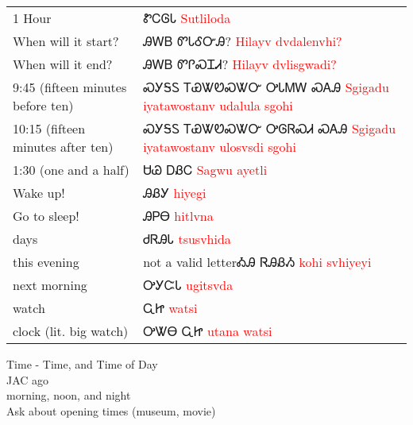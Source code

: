 \vfill\newpage\begin{minipage}{\linewidth}\begin{tabular}{p{3cm} p{11cm}}
1 Hour & ᏑᏟᎶᏓ 
 \newline \textcolor{red}{Sutliloda}\\
When will it start? & ᎯᎳᏴ ᏛᏓᎴᏅᎯ? 
 \newline \textcolor{red}{Hilayv dvdalenvhi?}\\
When will it end? & ᎯᎳᏴ ᏛᎵᏍᏆᏗ? 
 \newline \textcolor{red}{Hilayv dvlisgwadi?}\\
9:45 (fifteen minutes before ten) & ᏍᎩᎦᏚ ᎢᏯᏔᏬᏍᏔᏅ ᎤᏓᎷᎳ ᏍᎪᎯ 
 \newline \textcolor{red}{Sgigadu iyatawostanv udalula sgohi}\\
10:15 (fifteen minutes after ten) & ᏍᎩᎦᏚ ᎢᏯᏔᏬᏍᏔᏅ ᎤᎶᏒᏍᏗ ᏍᎪᎯ 
 \newline \textcolor{red}{Sgigadu iyatawostanv ulosvsdi sgohi}\\
1:30 (one and a half) & ᏌᏊ ᎠᏰᏟ 
 \newline \textcolor{red}{Sagwu ayetli}\\
Wake up! & ᎯᏰᎩ 
 \newline \textcolor{red}{hiyegi}\\
Go to sleep! & ᎯᏢᎾ 
 \newline \textcolor{red}{hitlvna}\\
days & ᏧᏒᎯᏓ 
 \newline \textcolor{red}{tsusvhida}\\
this evening & not a valid letterᎣᎯ ᏒᎯᏰᏱ 
 \newline \textcolor{red}{kohi svhiyeyi}\\
next morning & ᎤᎩᏨᏓ 
 \newline \textcolor{red}{ugitsvda}\\
watch & ᏩᏥ 
 \newline \textcolor{red}{watsi}\\
clock (lit. big watch) & ᎤᏔᎾ ᏩᏥ 
 \newline \textcolor{red}{utana watsi}\\
\end{tabular}
\end{minipage}

Time - Time, and Time of Day\\
JAC ago\\
morning, noon, and night\\
Ask about opening times (museum, movie)\\
\cite{walcpp42}\cite{walcpp47}
\index{}
